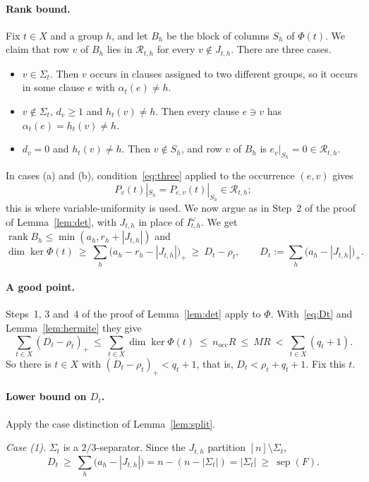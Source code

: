 \documentclass[11pt,a4paper]{article}
\theoremstyle{definition}
\theoremstyle{remark}
\newcommand{\cR}{\mathcal{R}}
\newcommand{\sep}{\operatorname{sep}}
\newcommand{\rank}{\operatorname{rank}}
\newcommand{\nocc}{n_{\mathrm{occ}}}
\begin{document}
\paragraph{Rank bound.} Fix $t\in X$ and a group $h$, and let $B_h$ be the block of columns
$S_h$ of $\Phi(t)$. We claim that row $v$ of $B_h$ lies in $\cR_{t,h}$ for every
$v\notin J_{t,h}$. There are three cases.
\begin{itemize}
\item[(a)] $v\in\Sigma_t$. Then $v$ occurs in clauses assigned to two different groups, so
 it occurs in some clause $e$ with $\alpha_t(e)\ne h$.
\item[(b)] $v\notin\Sigma_t$, $d_v\ge1$ and $h_t(v)\ne h$. Then every clause $e\ni v$ has
 $\alpha_t(e)=h_t(v)\ne h$.
\item[(c)] $d_v=0$ and $h_t(v)\ne h$. Then $v\notin S_h$, and row $v$ of $B_h$ is
 $e_v|_{S_h}=0\in\cR_{t,h}$.
\end{itemize}
In cases (a) and (b), condition~\eqref{eq:three} applied to the occurrence $(e,v)$ gives
\[
P_v(t)|_{S_h}=P_{e,v}(t)|_{S_h}\in\cR_{t,h};
\]
this is where variable-uniformity is used. We now argue as in Step~2 of the proof of
Lemma~\ref{lem:det}, with $J_{t,h}$ in place of $I^\omega_{t,h}$. We get
$\rank B_h\le\min(a_h,r_h+|J_{t,h}|)$ and
\begin{equation}\label{eq:Dt}
\dim\ker\Phi(t)\ \ge\ \sum_h\bigl(a_h-r_h-|J_{t,h}|\bigr)_+\ \ge\ D_t-\rho_t,
\qquad D_t:=\sum_h\bigl(a_h-|J_{t,h}|\bigr)_+ .
\end{equation}

\paragraph{A good point.} Steps~1, 3 and~4 of the proof of Lemma~\ref{lem:det} apply to
$\Phi$. With~\eqref{eq:Dt} and Lemma~\ref{lem:hermite} they give
\[
\sum_{t\in X}(D_t-\rho_t)_+\ \le\ \sum_{t\in X}\dim\ker\Phi(t)\ \le\ \nocc R\ \le\ MR
\ <\ \sum_{t\in X}(q_t+1).
\]
So there is $t\in X$ with $(D_t-\rho_t)_+<q_t+1$, that is, $D_t<\rho_t+q_t+1$. Fix this $t$.

\paragraph{Lower bound on $D_t$.} Apply the case distinction of Lemma~\ref{lem:split}.

\emph{Case (1).} $\Sigma_t$ is a $2/3$-separator. Since the $J_{t,h}$ partition
$[n]\setminus\Sigma_t$,
\[
D_t\ \ge\ \sum_h\bigl(a_h-|J_{t,h}|\bigr)=n-(n-|\Sigma_t|)=|\Sigma_t|\ \ge\ \sep(F).
\]
\end{document}
